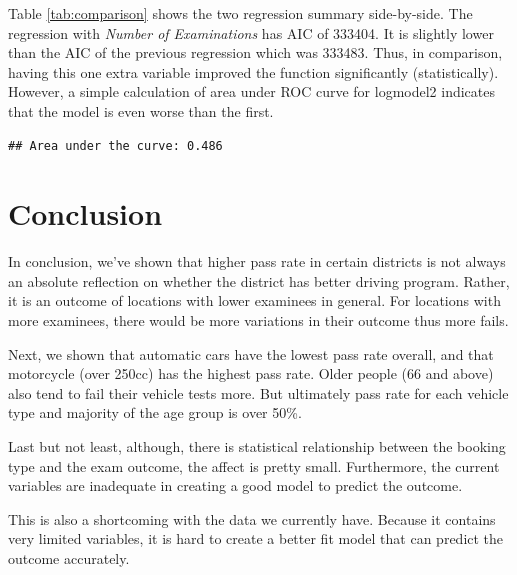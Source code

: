 \documentclass[11pt,a4paper,]{article}
\begin{document}
Table \ref{tab:comparison} shows the two regression summary side-by-side. The regression with \emph{Number of Examinations} has AIC of 333404. It is slightly lower than the AIC of the previous regression which was 333483. Thus, in comparison, having this one extra variable improved the function significantly (statistically). However, a simple calculation of area under ROC curve for logmodel2 indicates that the model is even worse than the first.

\begin{verbatim}
## Area under the curve: 0.486
\end{verbatim}

\section*{Conclusion}

In conclusion, we've shown that higher pass rate in certain districts is not always an absolute reflection on whether the district has better driving program. Rather, it is an outcome of locations with lower examinees in general. For locations with more examinees, there would be more variations in their outcome thus more fails.

Next, we shown that automatic cars have the lowest pass rate overall, and that motorcycle (over 250cc) has the highest pass rate. Older people (66 and above) also tend to fail their vehicle tests more. But ultimately pass rate for each vehicle type and majority of the age group is over 50\%.

Last but not least, although, there is statistical relationship between the booking type and the exam outcome, the affect is pretty small. Furthermore, the current variables are inadequate in creating a good model to predict the outcome.

This is also a shortcoming with the data we currently have. Because it contains very limited variables, it is hard to create a better fit model that can predict the outcome accurately.

\printbibliography
\end{document}
